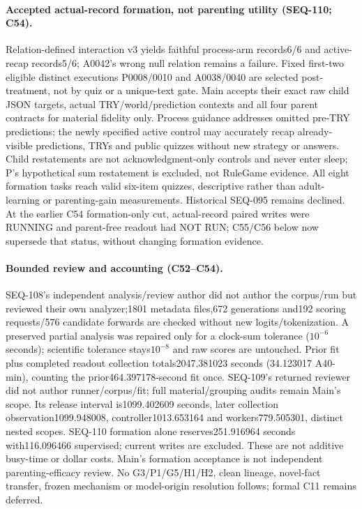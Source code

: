 \documentclass{article}
\begin{document}
\paragraph{Accepted actual-record formation, not parenting utility (SEQ-110; C54).} Relation-defined interaction v3 yields faithful process-arm records6/6 and active-recap records5/6; A0042's wrong null relation remains a failure. Fixed first-two eligible distinct executions P0008/0010 and A0038/0040 are selected post-treatment, not by quiz or a unique-text gate. Main accepts their exact raw child JSON targets, actual TRY/world/prediction contexts and all four parent contracts for material fidelity only. Process guidance addresses omitted pre-TRY predictions; the newly specified active control may accurately recap already-visible predictions, TRYs and public quizzes without new strategy or answers. Child restatements are not acknowledgment-only controls and never enter sleep; P's hypothetical sum restatement is excluded, not RuleGame evidence. All eight formation tasks reach valid six-item quizzes, descriptive rather than adult-learning or parenting-gain measurements. Historical SEQ-095 remains declined. At the earlier C54 formation-only cut, actual-record paired writes were RUNNING and parent-free readout had NOT RUN; C55/C56 below now supersede that status, without changing formation evidence.

\paragraph{Bounded review and accounting (C52--C54).} SEQ-108's independent analysis/review author did not author the corpus/run but reviewed their own analyzer;1801 metadata files,672 generations and192 scoring requests/576 candidate forwards are checked without new logits/tokenization. A preserved partial analysis was repaired only for a clock-sum tolerance ($10^{-6}$ seconds); scientific tolerance stays$10^{-8}$ and raw scores are untouched. Prior fit plus completed readout collection totals2047.381023 seconds (34.123017 A40-min), counting the prior464.397178-second fit once. SEQ-109's returned reviewer did not author runner/corpus/fit; full material/grouping audits remain Main's scope. Its release interval is1099.402609 seconds, later collection observation1099.948008, controller1013.653164 and workers779.505301, distinct nested scopes. SEQ-110 formation alone reserves251.916964 seconds with116.096466 supervised; current writes are excluded. These are not additive busy-time or dollar costs. Main's formation acceptance is not independent parenting-efficacy review. No G3/P1/G5/H1/H2, clean lineage, novel-fact transfer, frozen mechanism or model-origin resolution follows; formal C11 remains deferred.
\end{document}
